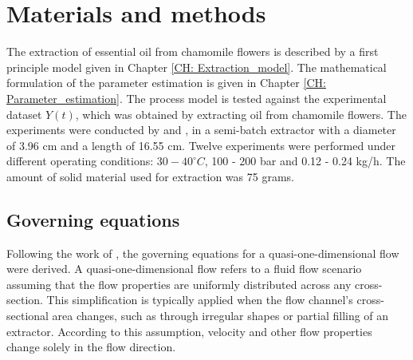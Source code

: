 \documentclass[a4paper,fleqn]{cas-dc}
\begin{document}


\section{Materials and methods} \label{CH: Materials and methods}

The extraction of essential oil from chamomile flowers is described by a first principle model given in Chapter \ref{CH: Extraction_model}. The mathematical formulation of the parameter estimation is given in Chapter \ref{CH: Parameter_estimation}. The process model is tested against the experimental dataset $Y(t)$, which was obtained by extracting oil from chamomile flowers. The experiments were conducted by \citet{Povh2001} and \citet{Rahimi2011}, in a semi-batch extractor with a diameter of 3.96 cm and a length of 16.55 cm. Twelve experiments were performed under different operating conditions: $30-40^\circ C$, 100 - 200 bar and 0.12 - 0.24 kg/h. The amount of solid material used for extraction was 75 grams.

\subsection{Governing equations} \label{CH:Governing_equations_chapter}
Following the work of \citet{Anderson1995}, the governing equations for a quasi-one-dimensional flow were derived. A quasi-one-dimensional flow refers to a fluid flow scenario assuming that the flow properties are uniformly distributed across any cross-section. This simplification is typically applied when the flow channel's cross-sectional area changes, such as through irregular shapes or partial filling of an extractor. According to this assumption, velocity and other flow properties change solely in the flow direction.
\end{document}
